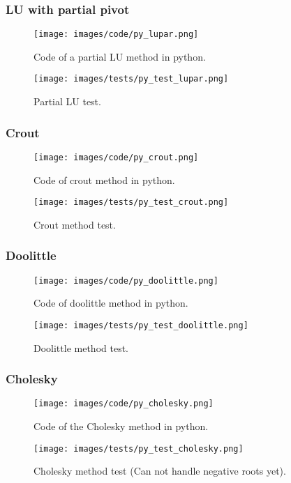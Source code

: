 \documentclass{article}
\begin{document}
\subsubsection{LU with partial pivot}
\begin{figure}[ht]
\centering
\texttt{[image: images/code/py\_lupar.png]}
\caption{\label{fig:py_bisc}Code of a partial LU method in python.}
\end{figure}
\FloatBarrier
\begin{figure}[ht]
\centering
\texttt{[image: images/tests/py\_test\_lupar.png]}
\caption{\label{fig:py_test_bisc}Partial LU test.}
\end{figure}
\FloatBarrier

\subsubsection{Crout}
\begin{figure}[ht]
\centering
\texttt{[image: images/code/py\_crout.png]}
\caption{\label{fig:py_falseRule}Code of crout method in python.}
\end{figure}
\FloatBarrier
\begin{figure}[ht]
\centering
\texttt{[image: images/tests/py\_test\_crout.png]}
\caption{\label{fig:py_falseRule}Crout method test.}
\end{figure}
\FloatBarrier

\subsubsection{Doolittle}
\begin{figure}[ht]
\centering
\texttt{[image: images/code/py\_doolittle.png]}
\caption{\label{fig:py_fixedPoint}Code of doolittle method in python.}
\end{figure}
\FloatBarrier
\begin{figure}[ht]
\centering
\texttt{[image: images/tests/py\_test\_doolittle.png]}
\caption{\label{fig:py_fixedPoint}Doolittle method test.}
\end{figure}
\FloatBarrier

\subsubsection{Cholesky}
\begin{figure}[ht]
\centering
\texttt{[image: images/code/py\_cholesky.png]}
\caption{\label{fig:py_newton}Code of the Cholesky method in python.}
\end{figure}
\FloatBarrier
\begin{figure}[ht]
\centering
\texttt{[image: images/tests/py\_test\_cholesky.png]}
\caption{\label{fig:py_newton}Cholesky method test (Can not handle negative roots yet).}
\end{figure}
\FloatBarrier
\end{document}
